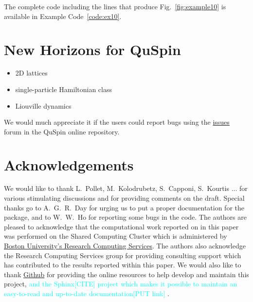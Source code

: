 \documentclass{SciPost}
\newcommand\0{\scalebox{-1}[1]{0}}
\newcommand*{\cyan}{\textcolor{cyan}}
\begin{document}
The complete code including the lines that produce Fig.~\ref{fig:example10} is available in Example Code~\ref{code:ex10}.



\section{New Horizons for QuSpin}
\label{sec:outro}

\begin{itemize}
	\item 2D lattices
	\item single-particle Hamiltonian class
	\item Liouville dynamics
\end{itemize}
 

We would much appreciate it if the users could report bugs using the \href{https://github.com/weinbe58/qspin/issues}{issues} forum in the QuSpin online repository.


\section*{Acknowledgements}
We would like to thank L.~Pollet, M.~Kolodrubetz, S.~Capponi, S.~Kourtis ... for various stimulating discussions and for providing comments on the draft. Special thanks go to A.~G.~R.~Day for urging us to put a proper documentation for the package, and to W.~W.~Ho for reporting some bugs in the code. The authors are pleased to acknowledge that the computational work reported on in this paper was performed on the Shared Computing Cluster which is administered by \href{http://www.bu.edu/tech/support/research/}{Boston University's Research Computing Services}. The authors also acknowledge the Research Computing Services group for providing consulting support which has contributed to the results reported within this paper. We would also like to thank \href{https://github.com/}{Github} for providing the online resources to help develop and maintain this project, \cyan{and the Sphinx[CITE] project which makes it possible to maintain an easy-to-read and up-to-date documentation[PUT link]} . 

\end{document}

